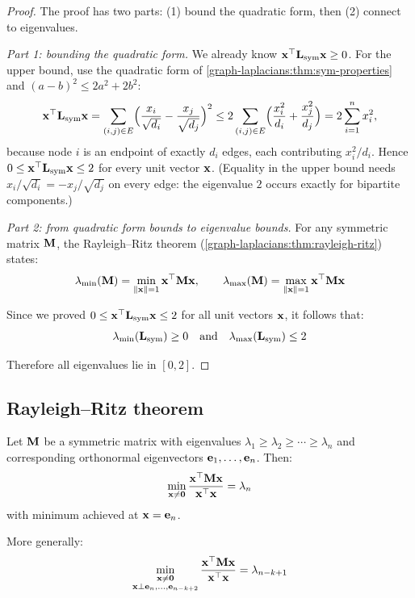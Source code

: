 \begin{notechapter}
\begin{proof}
The proof has two parts: (1) bound the quadratic form, then (2) connect to eigenvalues.

\emph{Part 1: bounding the quadratic form.} We already know $\mathbf{x}^\top\mathbf{L}_{\text{sym}}\mathbf{x}\geq0$. For the upper bound, use the quadratic form
of \cref{graph-laplacians:thm:sym-properties} and $(a - b)^2\leq2a^2 + 2b^2$:
\[
\mathbf{x}^\top\mathbf{L}_{\text{sym}}\mathbf{x} = \sum_{(i,j)\in E}\Bigl(\frac{x_i}{\sqrt{d_i}} - \frac{x_j}{\sqrt{d_j}}\Bigr)^2
\leq 2\sum_{(i,j)\in E}\Bigl(\frac{x_i^2}{d_i} + \frac{x_j^2}{d_j}\Bigr) = 2\sum_{i=1}^n x_i^2,
\]
because node $i$ is an endpoint of exactly $d_i$ edges, each contributing $x_i^2/d_i$. Hence $0\leq\mathbf{x}^\top\mathbf{L}_{\text{sym}}\mathbf{x}\leq2$ for every
unit vector $\mathbf{x}$. (Equality in the upper bound needs $x_i/\sqrt{d_i} = -x_j/\sqrt{d_j}$ on every edge: the eigenvalue $2$ occurs exactly
for bipartite components.)

\emph{Part 2: from quadratic form bounds to eigenvalue bounds.}
For any symmetric matrix $\mathbf{M}$, the Rayleigh--Ritz theorem (\cref{graph-laplacians:thm:rayleigh-ritz}) states:
\[
\lambda_{\min}(\mathbf{M}) = \min_{\|\mathbf{x}\| = 1} \mathbf{x}^\top \mathbf{M} \mathbf{x}, \qquad \lambda_{\max}(\mathbf{M}) = \max_{\|\mathbf{x}\| = 1} \mathbf{x}^\top \mathbf{M} \mathbf{x}
\]

Since we proved $0 \leq \mathbf{x}^\top \mathbf{L}_{\text{sym}} \mathbf{x} \leq 2$ for all unit vectors $\mathbf{x}$, it follows that:
\[
\lambda_{\min}(\mathbf{L}_{\text{sym}}) \geq 0 \quad \text{and} \quad \lambda_{\max}(\mathbf{L}_{\text{sym}}) \leq 2
\]

Therefore all eigenvalues lie in $[0, 2]$.
\end{proof}

\subsection{Rayleigh--Ritz theorem}

\begin{theorem}\label{graph-laplacians:thm:rayleigh-ritz}
Let $\mathbf{M}$ be a symmetric matrix with eigenvalues $\lambda_1 \geq \lambda_2 \geq \cdots \geq \lambda_n$ and corresponding orthonormal eigenvectors $\mathbf{e}_1, \ldots, \mathbf{e}_n$. Then:
\begin{equation}
\min_{\mathbf{x} \neq \mathbf{0}} \frac{\mathbf{x}^\top \mathbf{M} \mathbf{x}}{\mathbf{x}^\top \mathbf{x}} = \lambda_n
\end{equation}
with minimum achieved at $\mathbf{x} = \mathbf{e}_n$.

More generally:
\begin{equation}
\min_{\substack{\mathbf{x} \neq \mathbf{0} \\ \mathbf{x} \perp \mathbf{e}_n, \ldots, \mathbf{e}_{n-k+2}}} \frac{\mathbf{x}^\top \mathbf{M} \mathbf{x}}{\mathbf{x}^\top \mathbf{x}} = \lambda_{n-k+1}
\end{equation}
\end{theorem}


\end{notechapter}
